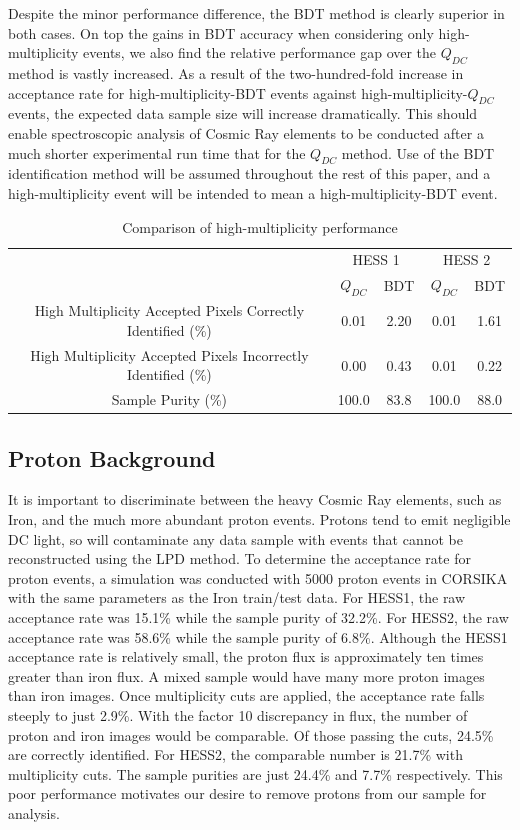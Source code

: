 \documentclass[11pt]{article}
\begin{document}
Despite the minor performance difference, the BDT method is clearly superior in both cases. On top the gains in BDT accuracy when considering only high-multiplicity events, we also find the relative performance gap over the $Q_{DC}$ method is vastly increased. As a result of the two-hundred-fold increase in acceptance rate for high-multiplicity-BDT events against high-multiplicity-$Q_{DC}$ events, the expected data sample size will increase dramatically. This should enable spectroscopic analysis of Cosmic Ray elements to be conducted after a much shorter experimental run time that for the $Q_{DC}$ method. Use of the BDT identification method will be assumed throughout the rest of this paper, and a high-multiplicity event will be intended to mean a high-multiplicity-BDT event.

\begin{table}[h!]
  \centering
  \caption{Comparison of high-multiplicity performance}
  \label{tab:highmultiplicitycomparison}
  \begin{tabular}{c|cc|cc}
    \toprule
    & \multicolumn{2}{c|}{HESS 1} & \multicolumn{2}{c}{HESS 2} \\
    & $Q_{DC}$ & BDT & $Q_{DC}$ & BDT\\
    \midrule
    High Multiplicity Accepted Pixels Correctly Identified (\%)& 0.01 & 2.20 & 0.01 & 1.61\\
    High Multiplicity Accepted Pixels Incorrectly Identified (\%)  & 0.00 & 0.43 & 0.01 & 0.22\\
    Sample Purity (\%)& 100.0 & 83.8 & 100.0 & 88.0\\
    \bottomrule
  \end{tabular}
\end{table}

\subsection{Proton Background}
It is important to discriminate between the heavy Cosmic Ray elements, such as Iron, and the much more abundant proton events. Protons tend to emit negligible DC light, so will contaminate any data sample with events that cannot be reconstructed using the LPD method. To determine the acceptance rate for proton events, a simulation was conducted with 5000 proton events in CORSIKA with the same parameters as the Iron train/test data. For HESS1, the raw acceptance rate was 15.1\% while the sample purity of 32.2\%. For HESS2, the raw acceptance rate was 58.6\% while the sample purity of 6.8\%. Although the HESS1 acceptance rate is relatively small, the proton flux is approximately ten times greater than iron flux. A mixed sample would have many more proton images than iron images. Once multiplicity cuts are applied, the acceptance rate falls steeply to just 2.9\%. With the factor 10 discrepancy in flux, the number of proton and iron images would be comparable. Of those passing the cuts, 24.5\% are correctly identified.  For HESS2, the comparable number is 21.7\% with multiplicity cuts. The sample purities are just 24.4\% and 7.7\% respectively. This poor performance motivates our desire to remove protons from our sample for analysis.
\end{document}
